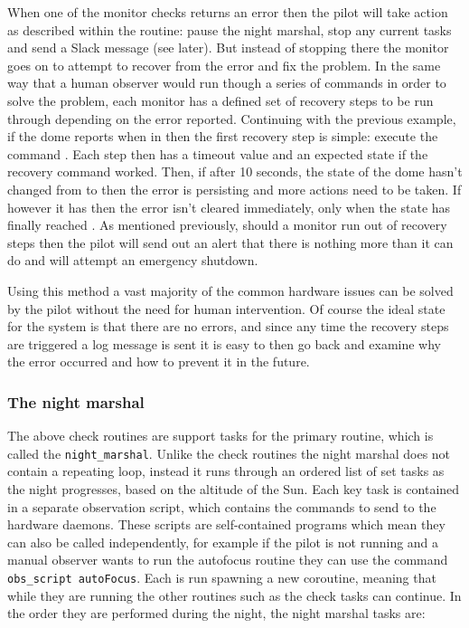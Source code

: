 \begin{colsection}
\begin{colsection}
When one of the monitor checks returns an error then the pilot will take action as described within the  routine: pause the night marshal, stop any current tasks and send a Slack message (see later). But instead of stopping there the monitor goes on to attempt to recover from the error and fix the problem. In the same way that a human observer would run though a series of commands in order to solve the problem, each monitor has a defined set of recovery steps to be run through depending on the error reported. Continuing with the previous example, if the dome reports  when in  then the first recovery step is simple: execute the command . Each step then has a timeout value and an expected state if the recovery command worked. Then, if after 10 seconds, the state of the dome hasn't changed from  to  then the error is persisting and more actions need to be taken. If however it has then the error isn't cleared immediately, only when the state has finally reached . As mentioned previously, should a monitor run out of recovery steps then the pilot will send out an alert that there is nothing more than it can do and will attempt an emergency shutdown.

Using this method a vast majority of the common hardware issues can be solved by the pilot without the need for human intervention. Of course the ideal state for the system is that there are no errors, and since any time the recovery steps are triggered a log message is sent it is easy to then go back and examine why the error occurred and how to prevent it in the future.

\subsubsection{The night marshal}

The above check routines are support tasks for the primary routine, which is called the \texttt{night\_marshal}. Unlike the check routines the night marshal does not contain a repeating loop, instead it runs through an ordered list of set tasks as the night progresses, based on the altitude of the Sun. Each key task is contained in a separate  observation script, which contains the commands to send to the hardware daemons. These scripts are self-contained programs which mean they can also be called independently, for example if the pilot is not running and a manual observer wants to run the autofocus routine they can use the command \texttt{obs\_script~autoFocus}. Each is run spawning a new coroutine, meaning that while they are running the other routines such as the check tasks can continue. In the order they are performed during the night, the night marshal tasks are:


\end{colsection}
\end{colsection}
